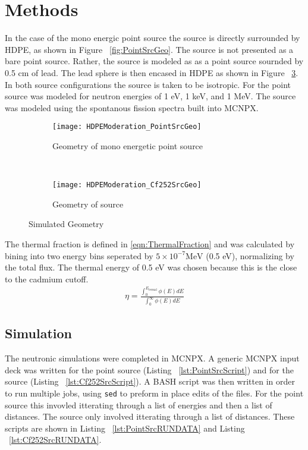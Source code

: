 \section{Methods}

In the case of the mono energic point source the source is directly surrounded by HDPE, as shown in Figure ~\ref{fig:PointSrcGeo}. 
The  source is not presented as a bare point source.
Rather, the source is modeled as as a point  source sournded by 0.5 cm of lead. The lead sphere is then encased in HDPE as shown in Figure ~\ref{fig:Cf252SrcGeo}.
In both source configurations the source is taken to be isotropic. 
For the point source was modeled for neutron energies of 1 eV, 1 keV, and 1 MeV.
The  source was modeled using the spontanous fission spectra built into MCNPX.
\begin{figure}
  \centering
  \begin{subfigure}[b]{0.45\textwidth}
    \centering
    \texttt{[image: HDPEModeration\_PointSrcGeo]}
    \caption{Geometry of mono energetic point source}
    \label{fig:Cf252SrcGeo}
  \end{subfigure}%
  ~
  \begin{subfigure}[b]{0.45\textwidth}
    \centering
    \texttt{[image: HDPEModeration\_Cf252SrcGeo]}
    \caption{Geometry of  source}
    \label{fig:Cf252SrcGeo}
  \end{subfigure}
  \caption{Simulated Geometry}
\end{figure}

The thermal fraction is defined in \eqref{eqn:ThermalFraction} and was calculated by bining into two energy bins seperated by $5\times10^{-7}\text{MeV}$ (0.5 eV), normalizing by the total flux.
The thermal energy of 0.5 eV was chosen because this is the close to the cadmium cutoff.
\begin{align}
    \label{eqn:ThermalFraction}
    \eta = \frac{\int_0 ^{E_\text{termal}} \phi(E)dE}{\int_0^\infty \phi(E)dE}
\end{align}

\subsection{Simulation}
The neutronic simulations were completed in MCNPX. 
A generic MCNPX input deck was written for the point source (Listing ~\ref{lst:PointSrcScript}) and for the  source (Listing ~\ref{lst:Cf252SrcScript}).
A BASH script was then written in order to run multiple jobs, using \verb+sed+ to preform in place edits of the files.
For the point source this invovled itterating through a list of energies and then a list of distances.
The  source only involved itterating through a list of distances.
These scripts are shown in Listing ~\ref{lst:PointSrcRUNDATA} and Listing ~\ref{lst:Cf252SrcRUNDATA}.

